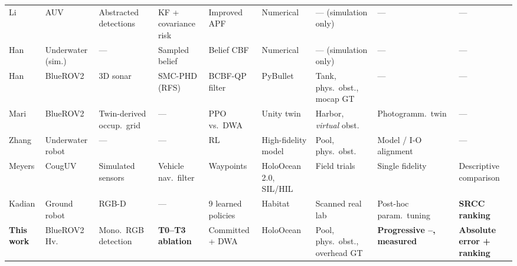 \begin{table}[t]
\begin{tabular}{@{}
  p{0.56in} p{0.54in} p{0.80in} p{0.66in} p{0.62in}
  p{0.66in} p{0.92in} p{0.72in} p{0.70in}@{}}
Li \cite{li2024anobstac}
  & AUV & Abstracted detections & KF + covariance risk
  & Improved APF & Numerical & --- (simulation only) & --- & --- \\
Han \cite{han2025riskaware}
  & Underwater (sim.) & --- & Sampled belief
  & Belief CBF & Numerical & --- (simulation only) & --- & --- \\
Han \cite{han2026riskawar}
  & BlueROV2 & 3D sonar & SMC-PHD (RFS)
  & BCBF-QP filter & PyBullet & Tank, phys.\ obst., mocap GT & --- & --- \\
Mari \cite{mari2026deeprein}
  & BlueROV2 & Twin-derived occup.\ grid & ---
  & PPO vs.\ DWA & Unity twin & Harbor, \emph{virtual} obst.\
  & Photogramm.\ twin & --- \\
Zhang \cite{zhang2025simtoreal}
  & Underwater robot & --- & ---
  & RL & High-fidelity model & Pool, phys.\ obst.\
  & Model / I-O alignment & --- \\
Meyers \cite{meyers2025testinga}
  & CougUV & Simulated sensors & Vehicle nav.\ filter
  & Waypoints & HoloOcean 2.0, SIL/HIL & Field trials
  & Single fidelity & Descriptive comparison \\
Kadian \cite{kadian2020simrealp}
  & Ground robot & RGB-D & ---
  & 9 learned policies & Habitat & Scanned real lab
  & Post-hoc param.\ tuning & \textbf{SRCC ranking} \\
\midrule
\textbf{This work}
  & BlueROV2 Hv.\ & Mono.\ RGB detection & \textbf{T0--T3 ablation}
  & Committed + DWA & HoloOcean & Pool, phys.\ obst., overhead GT
  & \textbf{Progressive \SZERO--\STHREE, measured}
  & \textbf{Absolute error + ranking} \\
\bottomrule
\end{tabular}
\end{table}
